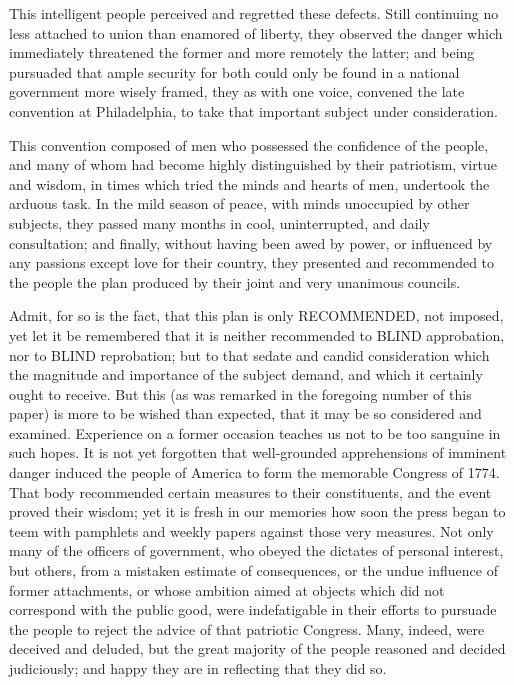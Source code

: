 This intelligent people perceived and regretted these defects.
Still continuing no less attached to union than enamored of
liberty, they observed the danger which immediately threatened the
former and more remotely the latter; and being pursuaded that ample
security for both could only be found in a national government more
wisely framed, they as with one voice, convened the late convention
at Philadelphia, to take that important subject under consideration.

This convention composed of men who possessed the confidence of
the people, and many of whom had become highly distinguished by
their patriotism, virtue and wisdom, in times which tried the minds
and hearts of men, undertook the arduous task. In the mild season
of peace, with minds unoccupied by other subjects, they passed many
months in cool, uninterrupted, and daily consultation; and finally,
without having been awed by power, or influenced by any passions
except love for their country, they presented and recommended to the
people the plan produced by their joint and very unanimous councils.

Admit, for so is the fact, that this plan is only RECOMMENDED,
not imposed, yet let it be remembered that it is neither recommended
to BLIND approbation, nor to BLIND reprobation; but to that sedate
and candid consideration which the magnitude and importance of the
subject demand, and which it certainly ought to receive. But this
(as was remarked in the foregoing number of this paper) is more to
be wished than expected, that it may be so considered and examined.
Experience on a former occasion teaches us not to be too sanguine
in such hopes. It is not yet forgotten that well-grounded
apprehensions of imminent danger induced the people of America to
form the memorable Congress of 1774. That body recommended certain
measures to their constituents, and the event proved their wisdom;
yet it is fresh in our memories how soon the press began to teem
with pamphlets and weekly papers against those very measures. Not
only many of the officers of government, who obeyed the dictates of
personal interest, but others, from a mistaken estimate of
consequences, or the undue influence of former attachments, or whose
ambition aimed at objects which did not correspond with the public
good, were indefatigable in their efforts to pursuade the people to
reject the advice of that patriotic Congress. Many, indeed, were
deceived and deluded, but the great majority of the people reasoned
and decided judiciously; and happy they are in reflecting that they
did so.

